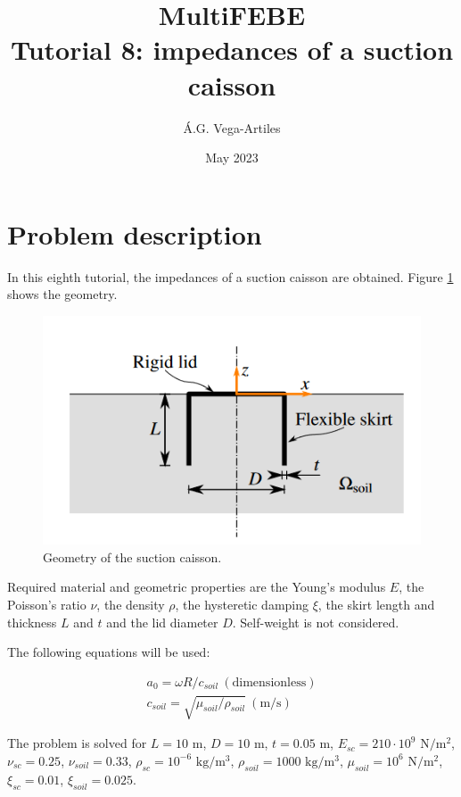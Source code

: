 \documentclass[a4]{article}
\title{MultiFEBE \\ Tutorial 8: impedances of a suction caisson}
\author{\'A.G. Vega-Artiles}
\date{May 2023}
\begin{document}
\maketitle

\tableofcontents

\section{Problem description}

In this eighth tutorial, the impedances of a suction caisson are obtained. Figure \ref{fig:geometry_suction_caisson} shows the geometry. 

\begin{figure}[tbh!]
	\centering
	\includegraphics[scale=0.6]{geometry_suction_caisson.png}
	\caption{Geometry of the suction caisson.}
	\label{fig:geometry_suction_caisson}
\end{figure}

Required material and geometric properties are the Young's modulus $E$, the Poisson's ratio $\nu$, the density $\rho$, the hysteretic damping $\xi$, the skirt length and thickness $L$ and $t$ and the lid diameter $D$. Self-weight is not considered.

The following equations will be used: 

\begin{equation}
	\begin{array}{l}
		a_0 = \omega R/c_{soil} \medspace \mathrm{(dimensionless)} \\
		c_{soil} = \sqrt{\mu_{soil}/\rho_{soil}}\medspace \mathrm{(m/s)} 
	\end{array}
\end{equation}

The problem is solved for $L=10$ $\mathrm{m}$, $D=10$ $\mathrm{m}$,  $t=0.05$ $\mathrm{m}$, $E_{sc} = 210 \cdot 10^9$ $\mathrm{N/m^2}$, $\nu_{sc}=0.25$, $\nu_{soil}=0.33$, $\rho_{sc}=10^{-6}$ $\mathrm{kg/m^3}$, $\rho_{soil}=1000$ $\mathrm{kg/m^3}$, $\mu_{soil}=10^{6}$ $\mathrm{N/m^2}$, $\xi_{sc}=0.01$, $\xi_{soil}=0.025$.
\end{document}
